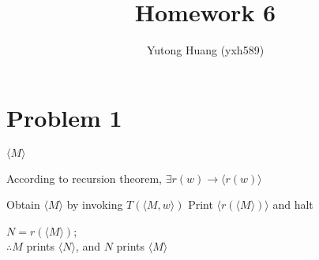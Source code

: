 \documentclass[letterpaper]{article}
\title{\vspace{-2cm}Homework 6}
\author{Yutong Huang (yxh589)}
\date{}
\begin{document}
\maketitle
\section*{Problem 1}

\begin{multicols}{2}
    \begin{minipage}{0.4\textwidth}
        \begin{algorithm}[H]
            \caption{$T(\langle M, w\rangle)$}
            \Return $\langle M \rangle$
        \end{algorithm}
        According to recursion theorem, $\exists r(w) \rightarrow \langle r(w) \rangle $

    \end{minipage}

    \begin{minipage}{0.4\textwidth}
        \begin{algorithm}[H]
            \caption{$M(w)$}
            Obtain $ \langle M \rangle $ by invoking $ T(\langle M, w\rangle) $\;
            Print $ \langle r( \langle M \rangle ) \rangle $ and halt\;
        \end{algorithm}
        $ N = r( \langle M \rangle ) $;\\
        $ \therefore  M $ prints $ \langle N \rangle $, and $N$ prints $ \langle M \rangle $
    \end{minipage}

\end{multicols}
\end{document}
